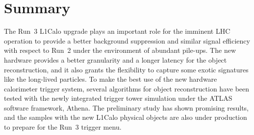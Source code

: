 \section{Summary}
The Run~3 L1Calo upgrade plays an important role for the imminent LHC operation to provide a better background suppression and similar signal efficiency with respect to Run~2 under the environment of abundant pile-ups. The new hardware provides a better granularity and a longer latency for the object reconstruction, and it also grants the flexibility to capture some exotic signatures like the long-lived particles. To make the best use of the new hardware calorimeter trigger system, several algorithms for object reconstruction have been tested with the newly integrated trigger tower simulation under the ATLAS software framework, Athena. The preliminary study has shown promising results, and the samples with the new L1Calo physical objects are also under production to prepare for the Run~3 trigger menu. 